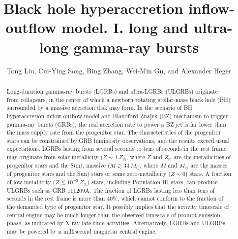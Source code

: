 \documentclass[twocolumn]{aastex6}
\begin{document}
\title{Black hole hyperaccretion inflow-outflow model. I. long and ultra-long gamma-ray bursts}

\author{Tong Liu, Cui-Ying Song, Bing Zhang, Wei-Min Gu, and Alexander Heger}


\begin{abstract}
Long-duration gamma-ray bursts (LGRBs) and ultra-LGRBs (ULGRBs) originate from collapsars, in the center of which a newborn rotating stellar-mass black hole (BH) surrounded by a massive accretion disk may form. In the scenario of BH hyperaccretion inflow-outflow model and Blandford-Znajek (BZ) mechanism to trigger gamma-ray bursts (GRBs), the real accretion rate to power a BZ jet is far lower than the mass supply rate from the progenitor star. The characteristics of the progenitor stars can be constrained by GRB luminosity observations, and the results exceed usual expectations. LGRBs lasting from several seconds to tens of seconds in the rest frame may originate from solar-metallicity ($Z \sim 1~ Z_\odot$, where $Z$ and $Z_\odot$ are the metallicities of progenitor stars and the Sun), massive ($M \gtrsim 34 ~M_\odot$, where $M$ and $M_\odot$ are the masses of progenitor stars and the Sun) stars or some zero-metallicity ($Z \sim 0$) stars. A fraction of low-metallicity ($Z \lesssim 10^{-2}~Z_\odot$) stars, including Population III stars, can produce ULGRBs such as GRB 111209A. The fraction of LGRBs lasting less than tens of seconds in the rest frame is more than 40$\%$, which cannot conform to the fraction of the demanded type of progenitor star. It possibly implies that the activity timescale of central engine may be much longer than the observed timescale of prompt emission phase, as indicated by X-ray late-time activities. Alternatively, LGRBs and ULGRBs may be powered by a millisecond magnetar central engine.
\end{abstract}
\end{document}
